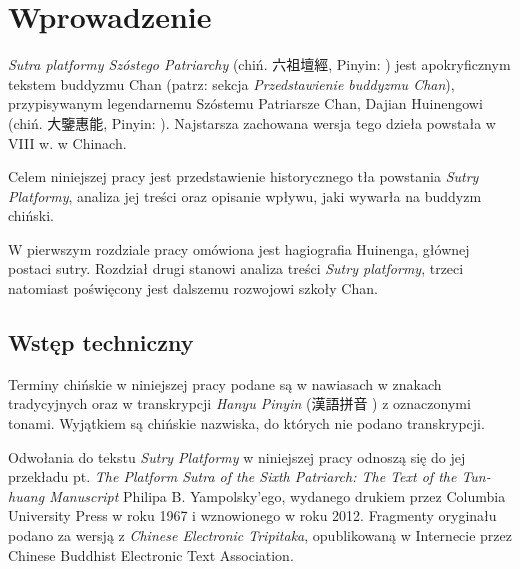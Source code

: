 \chapter*{Wprowadzenie}
\textit{Sutra platformy Szóstego Patriarchy} (chiń. 六祖壇經, Pinyin: ) jest apokryficznym tekstem buddyzmu Chan (patrz: sekcja \textit{Przedstawienie buddyzmu Chan}), przypisywanym legendarnemu Szóstemu Patriarsze Chan, Dajian Huinengowi (chiń. 大鑒惠能, Pinyin: ). Najstarsza zachowana wersja tego dzieła powstała w VIII w. w Chinach.

Celem niniejszej pracy jest przedstawienie historycznego tła powstania \textit{Sutry Platformy}, analiza jej treści oraz opisanie wpływu, jaki wywarła na buddyzm chiński.

W pierwszym rozdziale pracy omówiona jest hagiografia Huinenga, głównej postaci sutry.
Rozdział drugi stanowi analiza treści \textit{Sutry platformy}, trzeci natomiast poświęcony jest dalszemu rozwojowi szkoły Chan.

\section{Wstęp techniczny}
Terminy chińskie w niniejszej pracy podane są w nawiasach w znakach tradycyjnych oraz w transkrypcji \textit{Hanyu Pinyin} (漢語拼音 ) z oznaczonymi tonami. Wyjątkiem są chińskie nazwiska, do których nie podano transkrypcji.

Odwołania do tekstu \textit{Sutry Platformy} w niniejszej pracy odnoszą się do jej przekładu pt. \textit{The Platform Sutra of the Sixth Patriarch: The Text of the Tun-huang Manuscript} Philipa B. Yampolsky'ego, wydanego drukiem przez Columbia University Press w roku 1967 i wznowionego w roku 2012.
Fragmenty oryginału podano za wersją z \textit{Chinese Electronic Tripitaka}, opublikowaną w Internecie przez Chinese Buddhist Electronic Text Association.
%

